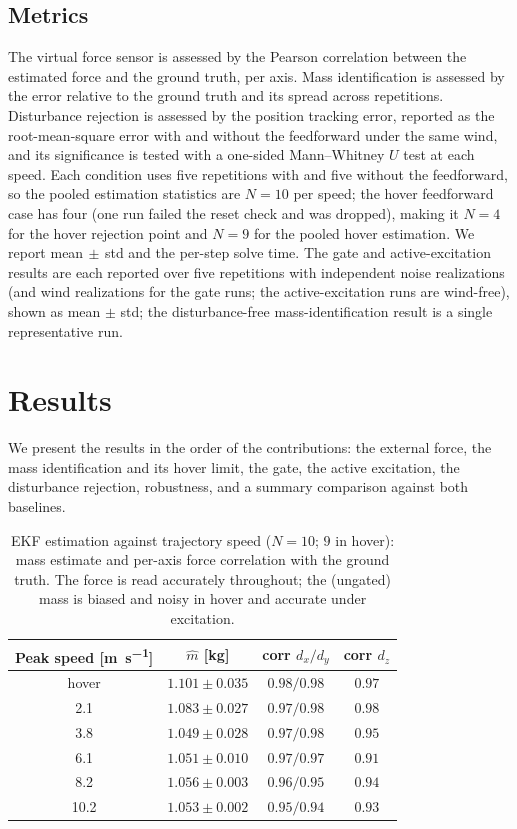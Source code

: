 \documentclass{ieeeaccess}
\begin{document}
\subsection{Metrics}
The virtual force sensor is assessed by the Pearson correlation between the
estimated force and the ground truth, per axis. Mass identification is assessed
by the error relative to the ground truth and its spread across repetitions.
Disturbance rejection is assessed by the position tracking error, reported as the
root-mean-square error with and without the feedforward under the same wind, and
its significance is tested with a one-sided Mann--Whitney $U$ test at each speed.
Each condition uses five repetitions with and five without the feedforward, so the
pooled estimation statistics are $N=10$ per speed; the hover feedforward case has
four (one run failed the reset check and was dropped), making it $N=4$ for the
hover rejection point and $N=9$ for the pooled hover estimation. We report
mean$\,\pm\,$std and the per-step solve time. The gate and active-excitation
results are each reported over five repetitions with independent noise
realizations (and wind realizations for the gate runs; the active-excitation runs
are wind-free), shown as mean $\pm$ std; the disturbance-free mass-identification
result is a single representative run.

\section{Results}\label{sec:results}

We present the results in the order of the contributions: the external force, the
mass identification and its hover limit, the gate, the active excitation, the
disturbance rejection, robustness, and a summary comparison against both
baselines.

\begin{table}[!t]
\centering
\caption{EKF estimation against trajectory speed ($N{=}10$; $9$ in hover): mass estimate and
per-axis force correlation with the ground truth. The force is read accurately
throughout; the (ungated) mass is biased and noisy in hover and accurate under
excitation.}
\label{tab:id}
\begin{tabular}{cccc}
\toprule
Peak speed [\si{\meter\per\second}] & $\hat m$ [\si{\kilogram}] & corr $d_x/d_y$ & corr $d_z$ \\
\midrule
hover & $1.101\pm0.035$ & $0.98/0.98$ & $0.97$ \\
2.1   & $1.083\pm0.027$ & $0.97/0.98$ & $0.98$ \\
3.8   & $1.049\pm0.028$ & $0.97/0.98$ & $0.95$ \\
6.1   & $1.051\pm0.010$ & $0.97/0.97$ & $0.91$ \\
8.2   & $1.056\pm0.003$ & $0.96/0.95$ & $0.94$ \\
10.2  & $1.053\pm0.002$ & $0.95/0.94$ & $0.93$ \\
\bottomrule
\end{tabular}
\end{table}
\end{document}
